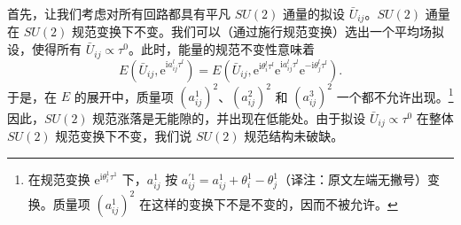 首先，让我们考虑对所有回路都具有平凡 $SU(2)$ 通量的拟设 $\bar{U}_{ij}$。$SU(2)$ 通量在 $SU(2)$ 规范变换下不变。我们可以（通过施行规范变换）选出一个平均场拟设，使得所有 $\bar{U}_{ij}\propto\tau^{0}$。此时，能量的规范不变性意味着
\begin{equation*}
E(\bar{U}_{ij},\mathrm{e}^{\mathrm{i}a_{ij}^{l}\tau^{l}})=E(\bar{U}_{ij},\mathrm{e}^{\mathrm{i}\theta_i^{l}\tau^{l}}\mathrm{e}^{\mathrm{i}a_{ij}^{l}\tau^{l}}\mathrm{e}^{-\mathrm{i}\theta_j^{l}\tau^{l}}).
\tag{9.2.22}
\end{equation*}
于是，在 $E$ 的展开中，质量项 $(a_{ij}^{1})^{2}$、$(a_{ij}^{2})^{2}$ 和 $(a_{ij}^{3})^{2}$ 一个都不允许出现。\footnote{在规范变换 $\mathrm{e}^{\mathrm{i}\theta_i^{1}\tau^{1}}$ 下，$a_{ij}^{1}$ 按 $a_{ij}^{\prime 1}=a_{ij}^{1}+\theta_i^{1}-\theta_j^{1}$（译注：原文左端无撇号）变换。质量项 $(a_{ij}^{1})^{2}$ 在这样的变换下不是不变的，因而不被允许。}因此，$SU(2)$ 规范涨落是无能隙的，并出现在低能处。由于拟设 $\bar{U}_{ij}\propto\tau^{0}$ 在整体 $SU(2)$ 规范变换下不变，我们说 $SU(2)$ 规范结构未破缺。

